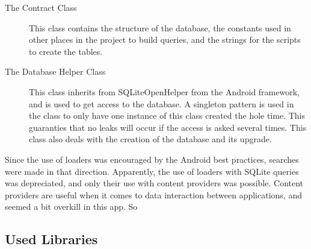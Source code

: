 \begin{description}
\item[The Contract Class] This class contains the structure of the database, the constants used in other places in the project to build queries, and the strings for the scripts to create the tables.

\item[The Database Helper Class] This class inherits from SQLiteOpenHelper from the Android framework, and is used to get access to the database. A singleton pattern is used in the class to only have one instance of this class created the hole time. This guaranties that no leaks will occur if the access is asked several times. This class also deals with the creation of the database and its upgrade.
\end{description}

Since the use of loaders was encouraged by the Android best practices, searches were made in that direction. Apparently, the use of loaders with SQLite queries was depreciated, and only their use with content providers was possible. Content providers are useful when it comes to data interaction between applications, and seemed a bit overkill in this app. So 

\subsection{Used Libraries}
\label{used_libraries}

